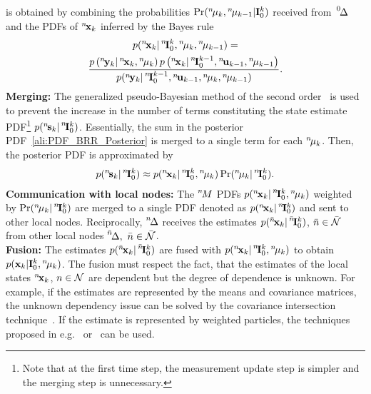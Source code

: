 \documentclass[conference,10pt]{IEEEtran}
\def\zeroth{\prescript{0\!}{}}
\def\nth{\prescript{n\!}{}}
\def\bnth{\prescript{\bar{n}\!}{}}
\begin{document}
is obtained by combining the probabilities $\Pr(\nth{\mu}_k,\nth{\mu}_{k-1} \vert \bfI^{k}_{0})$ received from~$\zeroth{\Delta}$ and the PDFs of $\nth{\bfx}_k$ inferred by the Bayes rule
\begin{multline*}
  p(\nth{\bfx}_{k}\vert\nth{\bfI}^{k}_{0},\nth{\mu}_k,\nth{\mu}_{k-1})
  =\\ \frac{p\left(\nth{\bfy}_{k} \vert\nth{\bfx}_{k},\nth{\mu}_k\right) 
  p\left(\nth{\bfx}_{k}\vert \nth{\bfI}^{k-1}_{0},\nth{\bfu}_{k-1},\nth{\mu}_{k-1}\right)}
  {p(\nth{\bfy}_k\vert\nth{\bfI}_0^{k-1},\nth{\bfu}_{k-1},\nth{\mu}_k,\nth{\mu}_{k-1})}.
\end{multline*}  
\textbf{Merging:} The generalized pseudo-Bayesian method of the second order~\cite{Watanabe1993:ja} is used to prevent the increase in the number of terms constituting the state estimate PDF\footnote{Note that at the first time step, the measurement update step is simpler and the merging step is unnecessary.} $p(\nth{\bfs}_{k} \vert\nth{\bfI}^{k}_{0})$. 
Essentially, the sum in the posterior PDF~\eqref{ali:PDF_BRR_Posterior} is merged to a single term for each $\nth{\mu}_k$.
Then, the posterior PDF is approximated by 
\begin{align}\label{ali:posterior}
  p(\nth{\bfs}_{k} \vert\nth{\bfI}^{k}_{0})\approx p(\nth{\bfx}_{k}\vert\nth{\bfI}^{k}_{0},\nth{\mu}_k) \Pr(\nth{\mu}_k\vert \nth{\bfI}^{k}_{0} ).
\end{align}
\textbf{Communication with local nodes:} The $\nth{M}$ PDFs $p(\nth{\bfx}_{k}\vert\nth{\bfI}^{k}_{0},\nth{\mu}_k)$ weighted by $\Pr(\nth{\mu}_k\vert \nth{\bfI}^{k}_{0} )$ are merged to a single PDF denoted as $p(\nth{\bfx}_k\vert\nth{\bfI}^k_0)$ and sent to other local nodes. 
Reciprocally, $\nth{\Delta}$ receives the estimates  $p(\bnth{\bfx}_k\vert\bnth{\bfI}^k_0)$, $\bar{n}\in\bar{\mathcal{N}}$ from other local nodes $\bnth{\Delta},\ \bar{n}\in\bar{\mcN}$.\\
\textbf{Fusion:}
The estimates $p(\bnth{\bfx}_k\vert\bnth{\bfI}^k_0)$ are fused with $p(\nth{\bfx}_{k}\vert\nth{\bfI}^{k}_{0},\nth{\mu}_k)$ to obtain $p(\bfx_{k}|\bfI_0^{k},\nth{\mu}_k)$.
The fusion must respect the fact, that the estimates of the local states $\nth{\bfx}_k$, $n\in\mathcal{N}$ are dependent but the degree of dependence is unknown. 
For example, if the estimates are represented by the means and covariance matrices, the unknown dependency issue can be solved by the covariance intersection technique~\cite{JuUhl:97}. 
If the estimate is represented by weighted particles, the techniques proposed in e.g.~\cite{Tslil2018:cp:IF} or~\cite{Ajgl2011:cp:IF} can be used.\\
\end{document}
